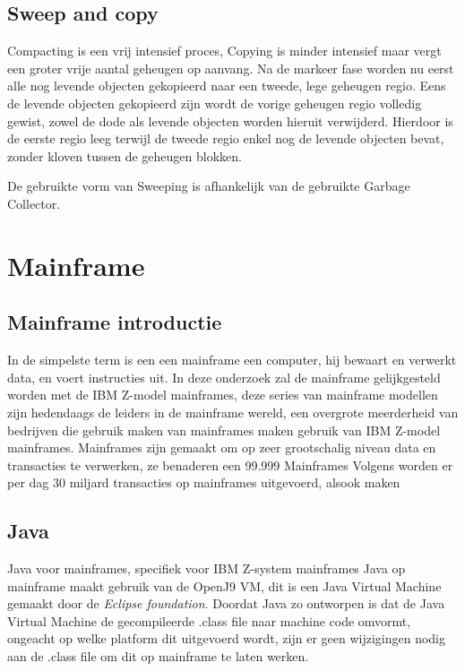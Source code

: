 \subsection{Sweep and copy}
Compacting is een vrij intensief proces, Copying is minder intensief maar vergt een groter vrije aantal geheugen op aanvang.
Na de markeer fase worden nu eerst alle nog levende objecten gekopieerd naar een tweede, lege geheugen regio.
Eens de levende objecten gekopieerd zijn wordt de vorige geheugen regio volledig gewist, zowel de dode als levende objecten worden hieruit verwijderd.
Hierdoor is de eerste regio leeg terwijl de tweede regio enkel nog de levende objecten bevat, zonder kloven tussen de geheugen blokken.

De gebruikte vorm van Sweeping is afhankelijk van de gebruikte Garbage Collector.
\autocite{Putten2022}


\section{Mainframe}
\label{sec:mainframe}
\subsection{Mainframe introductie}
\label{sec:mainframe introductie}

In de simpelste term is een een mainframe een computer, hij bewaart en verwerkt data, en voert instructies uit.
In deze onderzoek zal de mainframe gelijkgesteld worden met de IBM Z-model mainframes, deze series van mainframe modellen zijn hedendaags de leiders in de mainframe wereld, een overgrote meerderheid van bedrijven die gebruik maken van mainframes maken gebruik van IBM Z-model mainframes.
Mainframes zijn gemaakt om op zeer grootschalig niveau data en transacties te verwerken, ze benaderen een 99.999%
Mainframes 
Volgens \textcite{Critchley2021} worden er per dag 30 miljard transacties op mainframes uitgevoerd, alsook maken %



\subsection{Java}
\label{sec:mainframe java}
Java voor mainframes, specifiek voor IBM Z-system mainframes %
Java op mainframe maakt gebruik van de OpenJ9 VM, dit is een Java Virtual Machine gemaakt door de \textit{Eclipse foundation}.
Doordat Java zo ontworpen is dat de Java Virtual Machine de gecompileerde .class file naar machine code omvormt, ongeacht op welke platform dit uitgevoerd wordt, zijn er geen wijzigingen nodig aan de .class file om dit op mainframe te laten werken.


